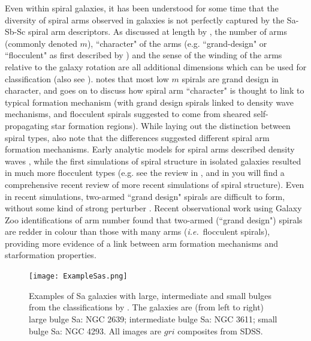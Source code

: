 \documentclass[usenatbib]{mn2e}
\newcommand{\ie}{{\it i.e.}}
\begin{document}
 Even within spiral galaxies, it has been understood for some time that the diversity of spiral arms observed in galaxies is not perfectly captured by the Sa-Sb-Sc spiral arm descriptors. As discussed at length by \citet{Buta2013}, the number of arms (commonly denoted $m$), ``character" of the arms (e.g. ``grand-design" or ``flocculent" as first described by \citealt{Elmegreen1981}) and the sense of the winding of the arms relative to the galaxy rotation are all additional dimensions which can be used for classification (also see \citealt{1987ApJ...314....3E,AnnLee2013}). \citet{Buta2013} notes that most low $m$ spirals are grand design in character, and goes on to discuss how spiral arm ``character" is thought to link to typical formation mechanism (with grand design spirals linked to density wave mechanisms, and flocculent spirals suggested to come from sheared self-propagating star formation regions). While laying out the distinction between spiral types, \citet{Elmegreen1981} also note that the differences suggested different spiral arm formation mechanisms. Early analytic models for spiral arms described density waves \citep{LinShu1964}, while the first simulations of spiral structure in isolated galaxies resulted in much more flocculent types (e.g. see the review in \citealt{Elmegreen1981}, and in  \citet{DobbsBaba2014} you will find a comprehensive recent review of more recent simulations of spiral structure). Even in recent simulations, two-armed ``grand design" spirals are difficult to form, without some kind of strong perturber \citep{Sellwood2011}. Recent observational work using Galaxy Zoo identifications of arm number \citep{Hart2016,Hart2017a} found that two-armed (``grand design") spirals are redder in colour than those with many arms (\ie ~flocculent spirals), providing more evidence of a link between arm formation mechanisms and starformation properties.  

\begin{figure}
\texttt{[image: ExampleSas.png]}
\caption{Examples of Sa galaxies with large, intermediate and small bulges from the classifications by \citet{Hogg1993}.  The galaxies are (from left to right) large bulge Sa: NGC 2639; intermediate bulge Sa: NGC 3611; small bulge Sa: NGC 4293. All images are $gri$ composites from SDSS. \label{Sa}}
\end{figure}
\end{document}
